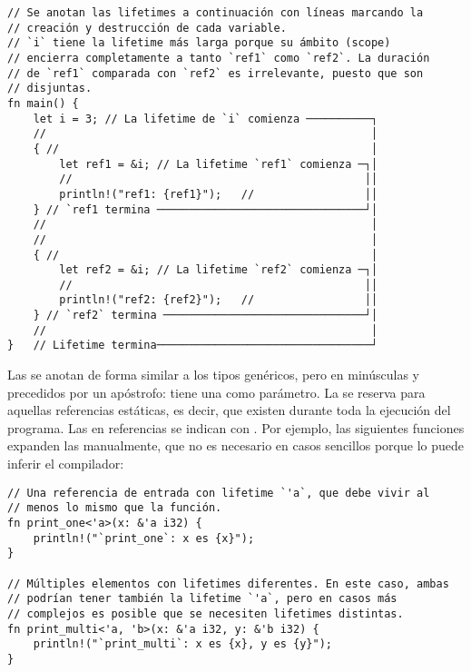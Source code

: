 \begin{verbatim}
// Se anotan las lifetimes a continuación con líneas marcando la
// creación y destrucción de cada variable.
// `i` tiene la lifetime más larga porque su ámbito (scope)
// encierra completamente a tanto `ref1` como `ref2`. La duración
// de `ref1` comparada con `ref2` es irrelevante, puesto que son
// disjuntas.
fn main() {
    let i = 3; // La lifetime de `i` comienza ──────────┐
    //                                                  │
    { //                                                │
        let ref1 = &i; // La lifetime `ref1` comienza ─┐│
        //                                             ││
        println!("ref1: {ref1}");   //                 ││
    } // `ref1 termina ────────────────────────────────┘│
    //                                                  │
    //                                                  │
    { //                                                │
        let ref2 = &i; // La lifetime `ref2` comienza ─┐│
        //                                             ││
        println!("ref2: {ref2}");   //                 ││
    } // `ref2` termina ───────────────────────────────┘│
    //                                                  │
}   // Lifetime termina─────────────────────────────────┘
\end{verbatim}

Las \lifetimes se anotan de forma similar a los tipos genéricos, pero en
minúsculas y precedidos por un apóstrofo:  tiene una \lifetime
{} como parámetro. La \lifetime {} se reserva para aquellas
referencias estáticas, es decir, que existen durante toda la ejecución del
programa. Las \lifetimes en referencias se indican con . Por
ejemplo, las siguientes funciones expanden las \lifetimes manualmente, que no es
necesario en casos sencillos porque lo puede inferir el compilador:

\begin{verbatim}
// Una referencia de entrada con lifetime `'a`, que debe vivir al
// menos lo mismo que la función.
fn print_one<'a>(x: &'a i32) {
    println!("`print_one`: x es {x}");
}

// Múltiples elementos con lifetimes diferentes. En este caso, ambas
// podrían tener también la lifetime `'a`, pero en casos más
// complejos es posible que se necesiten lifetimes distintas.
fn print_multi<'a, 'b>(x: &'a i32, y: &'b i32) {
    println!("`print_multi`: x es {x}, y es {y}");
}
\end{verbatim}

